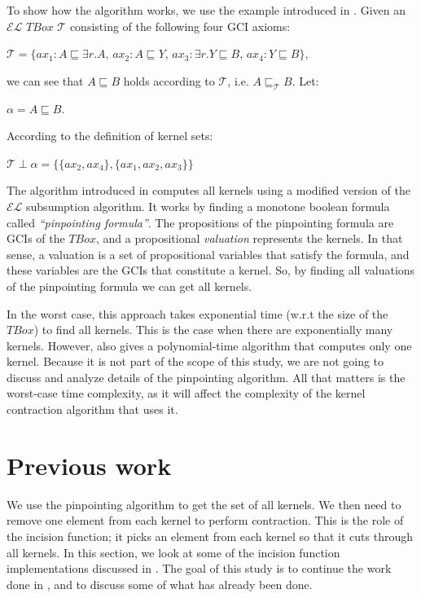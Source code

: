 To show how the algorithm works, we use the example introduced in \cite{pin}. Given an $\mathcal{EL}$ $TBox$ $\mathcal{T}$ consisting of the following four GCI axioms:
\begin{center}
$\mathcal{T} = \lbrace ax_1: A \sqsubseteq \exists{r}.A$, \hspace{7pt}  $ax_2: A \sqsubseteq Y$,  \hspace{7pt} $ax_3: \exists{r}.Y \sqsubseteq B$, \hspace{7pt} $ax_4: Y \sqsubseteq B \rbrace$,
\end{center}
we can see that $A \sqsubseteq B$ holds according to $\mathcal{T}$, i.e. $A \sqsubseteq_{\mathcal{T}} B$. Let: 
\begin{center} 
$\alpha = A \sqsubseteq B$.
\end{center}
According to the definition of kernel sets:
\begin{center}
$\mathcal{T} \perp \alpha = \lbrace \lbrace ax_2, ax_4 \rbrace, \lbrace ax_1, ax_2, ax_3 \rbrace \rbrace$
\end{center}
The algorithm introduced in \cite{pin} computes all kernels using a modified version of the $\mathcal{EL}$ subsumption algorithm. It works by finding a monotone boolean formula called \textit{``pinpointing formula''}. The propositions of the pinpointing formula are GCIs of the $TBox$, and a propositional \textit{valuation} represents the kernels. In that sense, a valuation is a set of propositional variables that satisfy the formula, and these variables are the GCIs that constitute a kernel. So, by finding all valuations of the pinpointing formula we can get all kernels.

In the worst case, this approach takes exponential time (w.r.t the size of the $TBox$) to find all kernels. This is the case when there are exponentially many kernels. However, \cite{pin} also gives a polynomial-time algorithm that computes only one kernel. Because it is not part of the scope of this study, we are not going to discuss and analyze details of the pinpointing algorithm. All that matters is the worst-case time complexity, as it will affect the complexity of the kernel contraction algorithm that uses it.


\section{Previous work}
We use the pinpointing algorithm to get the set of all kernels. We then need to remove one element from each kernel to perform contraction. This is the role of the incision function; it picks an element from each kernel so that it cuts through all kernels.
In this section, we look at some of the incision function implementations discussed in \cite{zwei}. The goal of this study is to continue the work done in \cite{zwei}, and to discuss some of what has already been done. 

